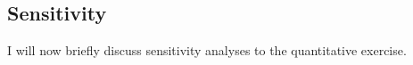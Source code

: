 \subsection{Sensitivity}
I will now briefly discuss sensitivity analyses to the quantitative exercise. 
